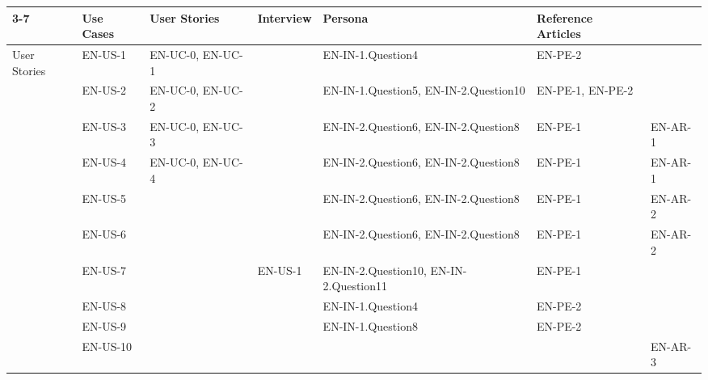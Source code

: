 \documentclass{report}
\begin{document}
\begin{center}
\begin{tabular}{ | m{3em} | m{2cm}| m{2cm}| m{2cm}| m{3.5cm} | m{1.8cm} | m{2cm} |} 
\cline{3-7}
\multicolumn{2}{ c |}{}& Use Cases & User Stories & Interview & Persona & Reference Articles \\ 
\hline
\multirow {10}{2em}{User Stories} 
& EN-US-1 & EN-UC-0, EN-UC-1 & & EN-IN-1.Question4 & EN-PE-2 & \\ \cline{2-7}  
& EN-US-2 & EN-UC-0, EN-UC-2 & & EN-IN-1.Question5, EN-IN-2.Question10 & EN-PE-1, EN-PE-2 & \\ \cline{2-7}
& EN-US-3 & EN-UC-0, EN-UC-3 &  & EN-IN-2.Question6,  EN-IN-2.Question8 & EN-PE-1 & EN-AR-1\\ \cline{2-7}
& EN-US-4 & EN-UC-0, EN-UC-4 & & EN-IN-2.Question6,  EN-IN-2.Question8 & EN-PE-1 & EN-AR-1\\ \cline{2-7}
& EN-US-5 &  &  & EN-IN-2.Question6,  EN-IN-2.Question8 & EN-PE-1 & EN-AR-2\\ \cline{2-7}
& EN-US-6 &  &  & EN-IN-2.Question6,  EN-IN-2.Question8 & EN-PE-1 & EN-AR-2\\ \cline{2-7}
& EN-US-7 &  & EN-US-1  & EN-IN-2.Question10,  EN-IN-2.Question11 & EN-PE-1 & \\ \cline{2-7}
& EN-US-8 &  & & EN-IN-1.Question4 & EN-PE-2 & \\ \cline{2-7}
& EN-US-9 &  &  & EN-IN-1.Question8 & EN-PE-2 & \\ \cline{2-7}
& EN-US-10 &  &  & &  & EN-AR-3\\ 

\hline
\end{tabular}
\end{center}
\end{document}
